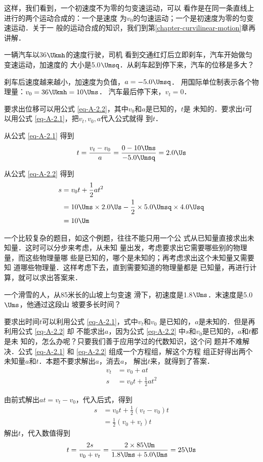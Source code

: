     这样，我们看到，一个初速度不为零的匀变速运动，可以
看作是在同一条直线上进行的两个运动合成的：一个是速度
为$v_0$的匀速运动；一个是初速度为零的匀变速运动．关于一
般的运动合成的知识，我们到第\ref{chapter-curvilinear-motion}章再讲解．

\begin{example}\label{exa-A-2.4}
一辆汽车以36$\Ukmh$的速度行驶，司机
看到交通红灯后立即刹车，汽车开始做匀变速运动，加速度的
大小是5.0$\Umsq$．从刹车起到停下来，汽车的位移是多大？
\end{example}

\begin{solution}
    刹车后速度越来越小，加速度为负值，$a=-5.0\Umsq$．
用国际单位制表示各个物理量：$v_0=36\Ukmh=10\Ums$．
汽车最后停下来，$v_t=0$．

    要求出位移可以用公式 \eqref{eq-A-2.2}，其中$v_0$和$a$是已知的，$t$是
未知的．要求出$t$可以用公式 \eqref{eq-A-2.1}，把$v_t,v_0,a$代入公式就得
到$t$．

从公式 \eqref{eq-A-2.1} 得到
\[t=\frac{v_t-v_0}{a}=\frac{0-10 \Ums}{-5.0\Umsq}=2.0 \Us \]

从公式 \eqref{eq-A-2.2} 得到
\[\begin{split}
s&=v_0t+\frac{1}{2}at^2\\
&=10\Ums \times 2.0 \Us-\frac{1}{2}\times 5.0\Umsq \times 4.0 \Usq\\
&=10 \Um
\end{split} \]


\end{solution}

    一个比较复杂的题目，如这个例题，往往不能只用一个公
式从已知量直接求出未知量．这时可以分步来考虑，从未知
量出发，考虑要求出它需要哪些别的物理量，而这些物理量哪
些是已知的，哪个是未知的；再考虑求出这个未知量又需要知
道哪些物理量．这样考虑下去，直到需要知道的物理量都是
已知量，再进行计算，就可以求出答案来．

\begin{example}\label{exa-A-2.5}
一个滑雪的人，从85米长的山坡上匀变速
滑下，初速度是1.8$\Ums$．末速度是5.0$\Ums$，他通过这段山
坡要多长时间？
\end{example}

\begin{solution}
    要求出时间$t$可以利用公式 \eqref{eq-A-2.1}，式中$v_t$和$v_0$
是已知的，$a$是未知的．但是再利用公式 \eqref{eq-A-2.2} 却
不能求出$a$，因为公式 \eqref{eq-A-2.2} 中$s$和$v_0$是已知的，$a$和$t$都是未
知的，怎么办呢？只要我们善于应用学过的代数知识，这个问
题并不难解决．公式 \eqref{eq-A-2.1} 和 \eqref{eq-A-2.2} 组成一个方程组，解这个方程
组正好得出两个未知量$a$和$t$．本题不要求解出$a$，消去$a$，
解出$t$来，就得到了答案．
\begin{align*}
v_t&=v_0+at\\
s&=v_0 t+\frac{1}{2}at^2
\end{align*}

由前式解出$at=v_t-v_0$，代入后式，得到
\[\begin{split}
s&=v_0t+\frac{1}{2}(v_t-v_0)t\\
&=\frac{1}{2}(v_0+v_t)t
\end{split} \]
解出$t$，代入数值得到
\[t=\frac{2s}{v_0+v_t}=\frac{2\times 85 \Um }{1.8\Ums+5.0\Ums}=25 \Us \]
\end{solution}


